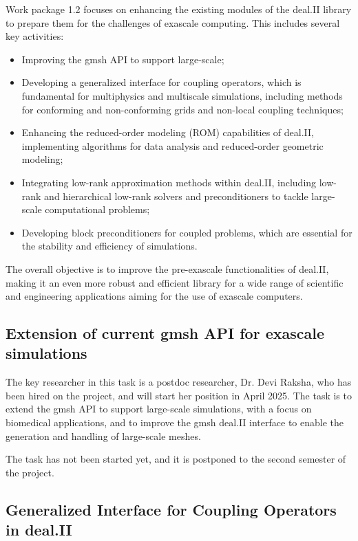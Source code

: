 \documentclass[a4paper,12pt]{article}
\begin{document}
Work package 1.2 focuses on enhancing the existing modules of the deal.II
library to prepare them for the challenges of exascale computing. This includes
several key activities: 
\begin{itemize}
    \item Improving the gmsh API to support large-scale;
    \item Developing a generalized interface for coupling operators, which
    is fundamental for multiphysics and multiscale simulations, including methods
    for conforming and non-conforming grids and non-local coupling techniques;
    \item Enhancing the reduced-order modeling (ROM) capabilities of deal.II,
    implementing algorithms for data analysis and reduced-order geometric modeling;
    \item Integrating low-rank approximation methods within deal.II, including
    low-rank and hierarchical low-rank solvers and preconditioners to tackle
    large-scale computational problems;
    \item Developing block preconditioners for coupled problems, which are
    essential for the stability and efficiency of simulations.
\end{itemize}
 
The overall objective is to improve the pre-exascale functionalities of deal.II,
making it an even more robust and efficient library for a wide range of
scientific and engineering applications aiming for the use of exascale
computers.

\subsection{Extension of current gmsh API for exascale simulations}
    The key researcher in this task is a postdoc researcher, Dr. Devi Raksha, who
    has been hired on the project, and will start her position in April 2025.
    The task is to extend the gmsh API to support large-scale simulations, with
    a focus on biomedical applications, and to improve the gmsh deal.II
    interface to enable the generation and handling of large-scale meshes.

    The task has not been started yet, and it is postponed to the second
    semester of the project.

\subsection{Generalized Interface for Coupling Operators in deal.II}
\end{document}
